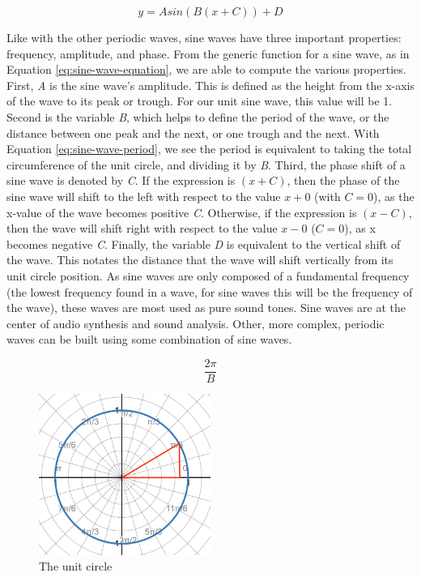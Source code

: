 \begin{equation}
	y = Asin(B(x + C)) + D
	\label{eq:sine-wave-equation}
\end{equation}

Like with the other periodic waves, sine waves have three important properties: frequency, amplitude, and phase. From the generic function for a sine wave, as in Equation \ref{eq:sine-wave-equation}, we are able to compute the various properties. First, \textit{A} is the sine wave's amplitude. This is defined as the height from the x-axis of the wave to its peak or trough. For our unit sine wave, this value will be 1. Second is the variable \textit{B}, which helps to define the period of the wave, or the distance between one peak and the next, or one trough and the next. With Equation \ref{eq:sine-wave-period}, we see the period is equivalent to taking the total circumference of the unit circle, and dividing it by \textit{B}. Third, the phase shift of a sine wave is denoted by \textit{C}. If the expression is $(x + C)$, then the phase of the sine wave will shift to the left with respect to the value $x + 0$ (with $C = 0$), as the x-value of the wave becomes positive \textit{C}. Otherwise, if the expression is $(x - C)$, then the wave will shift right with respect to the value $x - 0$ ($C = 0$), as x becomes negative \textit{C}. Finally, the variable \textit{D} is equivalent to the vertical shift of the wave. This notates the distance that the wave will shift vertically from its unit circle position. As sine waves are only composed of a fundamental frequency (the lowest frequency found in a wave, for sine waves this will be the frequency of the wave), these waves are most used as pure sound tones. Sine waves are at the center of audio synthesis and sound analysis. Other, more complex, periodic waves can be built using some combination of sine waves. 

\begin{equation}
	\frac{2\pi}{B}
	\label{eq:sine-wave-period}
\end{equation}

\begin{figure}
	\centering
	\includegraphics[width=0.5\textwidth]{figures/unit-circle.png}
	\caption{The unit circle}
	\label{fig:unit-circle}
\end{figure}

